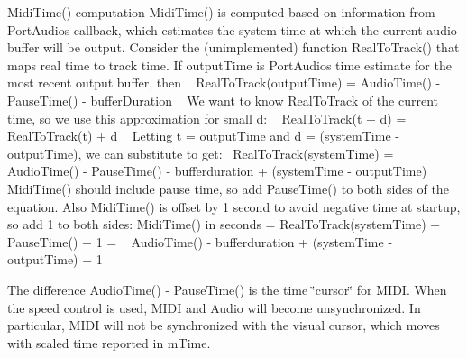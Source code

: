 \begin{DoxyParagraph}{Midi\+Time() computation}
Midi\+Time() is computed based on information from Port\+Audio\textquotesingle{}s callback, which estimates the system time at which the current audio buffer will be output. Consider the (unimplemented) function Real\+To\+Track() that maps real time to track time. If output\+Time is Port\+Audio\textquotesingle{}s time estimate for the most recent output buffer, then ~\newline
 Real\+To\+Track(output\+Time) = Audio\+Time() -\/ Pause\+Time() -\/ buffer\+Duration ~\newline
 We want to know Real\+To\+Track of the current time, so we use this approximation for small d\+: ~\newline
 Real\+To\+Track(t + d) = Real\+To\+Track(t) + d ~\newline
 Letting t = output\+Time and d = (system\+Time -\/ output\+Time), we can substitute to get\+:~\newline
 Real\+To\+Track(system\+Time) = Audio\+Time() -\/ Pause\+Time() -\/ bufferduration + (system\+Time -\/ output\+Time) ~\newline
 Midi\+Time() should include pause time, so add Pause\+Time() to both sides of the equation. Also Midi\+Time() is offset by 1 second to avoid negative time at startup, so add 1 to both sides\+: Midi\+Time() in seconds = Real\+To\+Track(system\+Time) + Pause\+Time() + 1 = ~\newline
 Audio\+Time() -\/ bufferduration + (system\+Time -\/ output\+Time) + 1
\end{DoxyParagraph}
\begin{DoxyParagraph}{}
The difference Audio\+Time() -\/ Pause\+Time() is the time \char`\"{}cursor\char`\"{} for M\+I\+DI. When the speed control is used, M\+I\+DI and Audio will become unsynchronized. In particular, M\+I\+DI will not be synchronized with the visual cursor, which moves with scaled time reported in m\+Time.
\end{DoxyParagraph}
